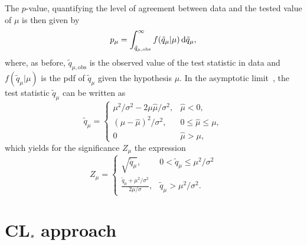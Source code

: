 The $p$-value, quantifying the level of agreement between data and the tested value of $\mu$ is then given by
\begin{equation}
		p_\mu = \int_{\tilde{q}_{\mu,\mathrm{obs}}}^{\infty}{f(\tilde{q}_\mu\vert \mu)\mathop{}\!\mathrm{d} \tilde{q}_\mu},
		\label{eq:pmu}
\end{equation}
where, as before, $\tilde{q}_{\mu,\mathrm{obs}}$ is the observed value of the test statistic in data and $f(\tilde{q}_\mu\vert \mu)$ is the \gls{pdf} of $\tilde{q}_\mu$ given the hypothesis $\mu$.
In the asymptotic limit~\cite{Cowan:2010js}, the test statistic $\tilde{q}_\mu$ can be written as
\begin{equation}
	\tilde{q}_\mu = 
\begin{cases}
    \mu^2/\sigma^2 - 2\mu\hat{\mu}/\sigma^2, & \hat{\mu} < 0,\\
    (\mu-\hat{\mu})^2/\sigma^2,              & 0 \leq \hat{\mu} \leq \mu, \\
    0  & \hat{\mu} > \mu,
\end{cases}
\end{equation}
which yields for the significance $Z_\mu$ the expression
\begin{equation}
	Z_\mu = 
\begin{cases}
    \sqrt{\tilde{q}_\mu}, & 0 < \tilde{q}_\mu \leq \mu^2/\sigma^2 \\
    \frac{\tilde{q}_\mu + \mu^2/\sigma^2}{2\mu/\sigma},              & \tilde{q}_\mu > \mu^2/\sigma^2 .
\end{cases}
\end{equation}

\section[CL$_s$ approach]{CL$\makemebold{_s}$ approach}\label{sec:cls_approach}

